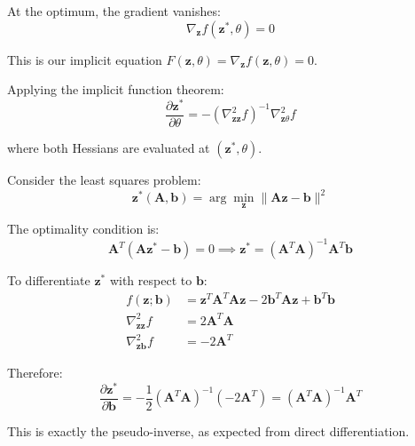 At the optimum, the gradient vanishes:
\begin{equation}
\nabla_{\mathbf{z}} f(\mathbf{z}^*, \theta) = 0
\end{equation}

This is our implicit equation $F(\mathbf{z}, \theta) = \nabla_{\mathbf{z}} f(\mathbf{z}, \theta) = 0$.

Applying the implicit function theorem:
\begin{equation}
\frac{\partial \mathbf{z}^*}{\partial \theta} = -\left( \nabla^2_{\mathbf{z}\mathbf{z}} f \right)^{-1} \nabla^2_{\mathbf{z}\theta} f
\label{eq:unconstrained_implicit}
\end{equation}

where both Hessians are evaluated at $(\mathbf{z}^*, \theta)$.

\begin{example}
\label{ex:implicit_least_squares}
Consider the least squares problem:
\begin{equation}
\mathbf{z}^*(\mathbf{A}, \mathbf{b}) = \arg\min_{\mathbf{z}} \| \mathbf{A} \mathbf{z} - \mathbf{b} \|^2
\end{equation}

The optimality condition is:
\begin{equation}
\mathbf{A}^T (\mathbf{A} \mathbf{z}^* - \mathbf{b}) = 0 \implies \mathbf{z}^* = (\mathbf{A}^T \mathbf{A})^{-1} \mathbf{A}^T \mathbf{b}
\end{equation}

To differentiate $\mathbf{z}^*$ with respect to $\mathbf{b}$:
\begin{align}
f(\mathbf{z}; \mathbf{b}) &= \mathbf{z}^T \mathbf{A}^T \mathbf{A} \mathbf{z} - 2 \mathbf{b}^T \mathbf{A} \mathbf{z} + \mathbf{b}^T \mathbf{b} \\
\nabla^2_{\mathbf{z}\mathbf{z}} f &= 2 \mathbf{A}^T \mathbf{A} \\
\nabla^2_{\mathbf{z}\mathbf{b}} f &= -2 \mathbf{A}^T
\end{align}

Therefore:
\begin{equation}
\frac{\partial \mathbf{z}^*}{\partial \mathbf{b}} = -\frac{1}{2} (\mathbf{A}^T \mathbf{A})^{-1} (-2 \mathbf{A}^T) = (\mathbf{A}^T \mathbf{A})^{-1} \mathbf{A}^T
\end{equation}

This is exactly the pseudo-inverse, as expected from direct differentiation.
\end{example}

